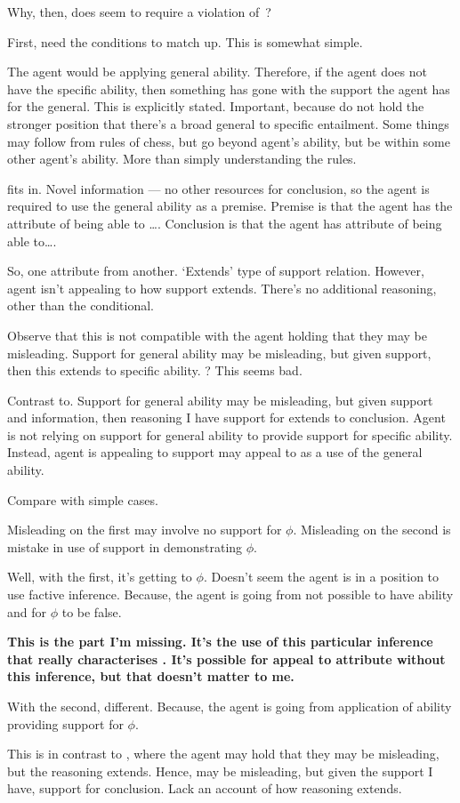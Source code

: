 \begin{note}[~\nI{} and \AR{}]
  Why, then, does \AR{} seem to require a violation of~\nI{}?

  First, need the conditions to match up.
  This is somewhat simple.

  The agent would be applying general ability.
  Therefore, if the agent does not have the specific ability, then something has gone with the support the agent has for the general.
  This is explicitly stated.
  Important, because do not hold the stronger position that there's a broad general to specific entailment.
  Some things may follow from rules of chess, but go beyond agent's ability, but be within some other agent's ability.
  More than simply understanding the rules.

  \AR{} fits in.
  Novel information --- no other resources for conclusion, so the agent is required to use the general ability as a premise.
  Premise is that the agent has the attribute of being able to \dots.
  Conclusion is that the agent has attribute of being able to\dots.

  So, one attribute from another.
  `Extends' type of support relation.
  However, agent isn't appealing to how support extends.
  There's no additional reasoning, other than the conditional.

  Observe that this is not compatible with the agent holding that they may be misleading.
  Support for general ability may be misleading, but given support, then this extends to specific ability.
  ? This seems bad.

  Contrast to.
  Support for general ability may be misleading, but given support and information, then reasoning I have support for extends to conclusion.
  Agent is not relying on support for general ability to provide support for specific ability.
  Instead, agent is appealing to support may appeal to as a use of the general ability.

  Compare with simple cases.
 
  Misleading on the first may involve no support for \(\phi\).
  Misleading on the second is mistake in use of support in demonstrating \(\phi\).
  {
    \color{green}
    Well, with the first, it's getting to \(\phi\).
    Doesn't seem the agent is in a position to use factive inference.
    Because, the agent is going from not possible to have ability and for \(\phi\) to be false.

    \textbf{
      This is the part I'm missing.
      It's the use of this particular inference that really characterises \AR{}.
      It's possible for appeal to attribute without this inference, but that doesn't matter to me.
    }

    With the second, different.
    Because, the agent is going from application of ability providing support for \(\phi\).
  }

  {
    \color{red}
    This is in contrast to \WR{}, where the agent may hold that they may be misleading, but the reasoning extends.
    Hence, may be misleading, but given the support I have, support for conclusion.
    Lack an account of how reasoning extends.
  }
\end{note}


